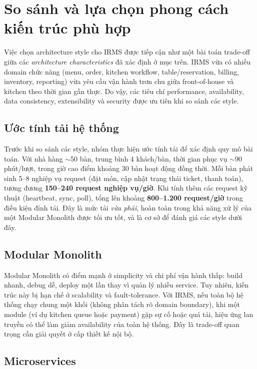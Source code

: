 \section{So sánh và lựa chọn phong cách kiến trúc phù hợp}
 
Việc chọn architecture style cho IRMS được tiếp cận như một bài toán trade-off giữa các \textit{architecture characteristics} đã xác định ở mục trên. IRMS vừa có nhiều domain chức năng (menu, order, kitchen workflow, table/reservation, billing, inventory, reporting) vừa yêu cầu vận hành trơn chu giữa front-of-house và kitchen theo thời gian gần thực. Do vậy, các tiêu chí performance, availability, data consistency, extensibility và security được ưu tiên khi so sánh các style.
 
\subsection{Ước tính tải hệ thống}
 
Trước khi so sánh các style, nhóm thực hiện ước tính tải để xác định quy mô bài toán. Với nhà hàng $\sim$50 bàn, trung bình 4 khách/bàn, thời gian phục vụ $\sim$90 phút/lượt, trong giờ cao điểm khoảng 30 bàn hoạt động đồng thời. Mỗi bàn phát sinh 5--8 nghiệp vụ request (đặt món, cập nhật trạng thái ticket, thanh toán), tương đương \textbf{150--240 request nghiệp vụ/giờ}. Khi tính thêm các request kỹ thuật (heartbeat, sync, poll), tổng lên khoảng \textbf{800--1.200 request/giờ} trong điều kiện đỉnh tải. Đây là mức tải \textit{vừa phải}, hoàn toàn trong khả năng xử lý của một Modular Monolith được tối ưu tốt, và là cơ sở để đánh giá các style dưới đây.
 
\subsection{Modular Monolith}
 
Modular Monolith có điểm mạnh ở simplicity và chi phí vận hành thấp: build nhanh, debug dễ, deploy một lần thay vì quản lý nhiều service. Tuy nhiên, kiến trúc này bị hạn chế ở scalability và fault-tolerance. Với IRMS, nếu toàn bộ hệ thống chạy chung một khối (không phân tách rõ domain boundary), khi một module (ví dụ kitchen queue hoặc payment) gặp sự cố hoặc quá tải, hiệu ứng lan truyền có thể làm giảm availability của toàn hệ thống. Đây là trade-off quan trọng cần giải quyết ở cấp thiết kế nội bộ.
 
\subsection{Microservices}
 
